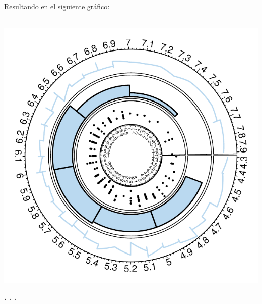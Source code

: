 \documentclass{article}\usepackage[]{graphicx}\usepackage[]{color}
\makeatletter
\def\maxwidth{ %
  \ifdim\Gin@nat@width>\linewidth
    \linewidth
  \else
    \Gin@nat@width
  \fi
}
\newenvironment{knitrout}{}{} %
\makeatother
\begin{document}
Resultando en el siguiente gr\'afico:~\\~\\
\begin{knitrout}
\color{fgcolor}

{\centering \includegraphics[width=\maxwidth]{figure/plot_ring_cir-1} 

}



\end{knitrout}
\begin{center}
\textbf{. . .}
\end{center}
\end{document}
